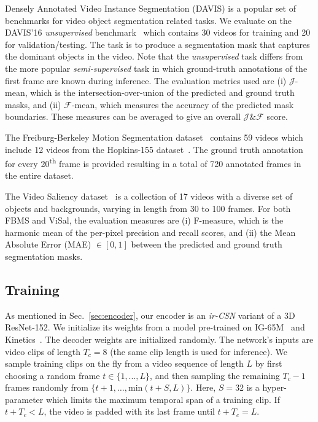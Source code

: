 \documentclass{bmvc2k}
\newcommand{\PAR}[1]{\vskip4pt \noindent {\bf #1~}}
\begin{document}
\PAR{DAVIS'16.} Densely Annotated Video Instance Segmentation (DAVIS) is a popular set of benchmarks for video object segmentation related tasks. We evaluate on the DAVIS'16 \textit{unsupervised} benchmark~\cite{Perazzi16CVPR} which contains 30 videos for training and 20 for validation/testing. 
The task is to produce a segmentation mask that captures the dominant objects in the video. 
Note that the \textit{unsupervised} task differs from the more popular \textit{semi-supervised} task in which ground-truth annotations of the first frame are known during inference. The evaluation metrics used are (i) $\mathcal{J}$-mean, which is the intersection-over-union of the predicted and ground truth masks, and (ii) $\mathcal{F}$-mean, which measures the accuracy of the predicted mask boundaries. These measures can be averaged to give an overall $\mathcal{J}\&\mathcal{F}$ score.

\PAR{FBMS.} The Freiburg-Berkeley Motion Segmentation dataset~\cite{Ochs13TPAMI} contains 59 videos which include 12 videos from the Hopkins-155 dataset~\cite{Tron07CVPR}. 
The ground truth annotation for every 20\textsuperscript{th} frame is provided resulting in a total of 720 annotated frames in the entire dataset.

\PAR{ViSal.} The Video Saliency dataset~\cite{Wang15TIP} is a collection of 17 videos with a diverse set of objects and backgrounds, varying in length from 30 to 100 frames.
For both FBMS and ViSal, the evaluation measures are (i) F-measure, which is the harmonic mean of the per-pixel precision and recall scores, and (ii) the Mean Absolute Error (MAE) $\in [0,1]$ between the predicted and ground truth segmentation masks.

\subsection{Training}
\label{sec:training}

As mentioned in Sec.~\ref{sec:encoder}, our encoder is an \textit{ir-CSN} variant of a 3D ResNet-152. We initialize its weights from a model pre-trained on IG-65M~\cite{Ghadiyaram19CVPR} and Kinetics~\cite{Kay17ARXIV}. The decoder weights are initialized randomly. 
The network's inputs are video clips of length $T_c=8$ (the same clip length is used for inference). We sample training clips on the fly from a video sequence of length $L$ by first choosing a random frame $t \in \{1,..., L\}$, and then sampling the remaining $T_c-1$ frames randomly from $\{t+1,\ldots, \text{min}(t+S, L)\}$.
Here, $S=32$ is a hyper-parameter which limits the maximum temporal span of a training clip. If $t+T_c < L$, the video is padded with its last frame until $t+T_c = L$. 
\end{document}
